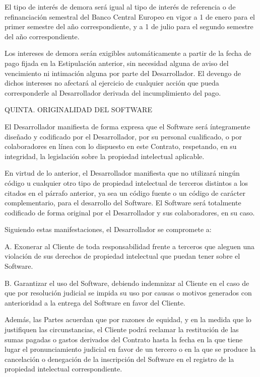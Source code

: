 \documentclass[a4paper,11pt]{report}
\begin{document}
El tipo de interés de demora será igual al tipo de interés de referencia
o de refinanciación semestral del Banco Central Europeo en vigor a 1 de
enero para el primer semestre del año correspondiente, y a 1 de julio
para el segundo semestre del año correspondiente.

Los intereses de demora serán exigibles automáticamente a partir de la
fecha de pago fijada en la Estipulación anterior, sin necesidad alguna
de aviso del vencimiento ni intimación alguna por parte del
Desarrollador. El devengo de dichos intereses no afectará al ejercicio
de cualquier acción que pueda corresponderle al Desarrollador derivada
del incumplimiento del pago.

QUINTA. ORIGINALIDAD DEL SOFTWARE

El Desarrollador manifiesta de forma expresa que el Software será
íntegramente diseñado y codificado por el Desarrollador, por su personal
cualificado, o por colaboradores en línea con lo dispuesto en este
Contrato, respetando, en su integridad, la legislación sobre la
propiedad intelectual aplicable.

En virtud de lo anterior, el Desarrollador manifiesta que no utilizará
ningún código u cualquier otro tipo de propiedad intelectual de terceros
distintos a los citados en el párrafo anterior, ya sea un código fuente
o un código de carácter complementario, para el desarrollo del Software.
El Software será totalmente codificado de forma original por el
Desarrollador y sus colaboradores, en su caso.

Siguiendo estas manifestaciones, el Desarrollador se compromete a:

A. Exonerar al Cliente de toda responsabilidad frente a terceros que
aleguen una violación de sus derechos de propiedad intelectual que
puedan tener sobre el Software.

B. Garantizar el uso del Software, debiendo indemnizar al Cliente en el
caso de que por resolución judicial se impida su uso por causas o
motivos generados con anterioridad a la entrega del Software en favor
del Cliente.

Además, las Partes acuerdan que por razones de equidad, y en la medida
que lo justifiquen las circunstancias, el Cliente podrá reclamar la
restitución de las sumas pagadas o gastos derivados del Contrato hasta
la fecha en la que tiene lugar el pronunciamiento judicial en favor de
un tercero o en la que se produce la cancelación o denegación de la
inscripción del Software en el registro de la propiedad intelectual
correspondiente.
\end{document}
